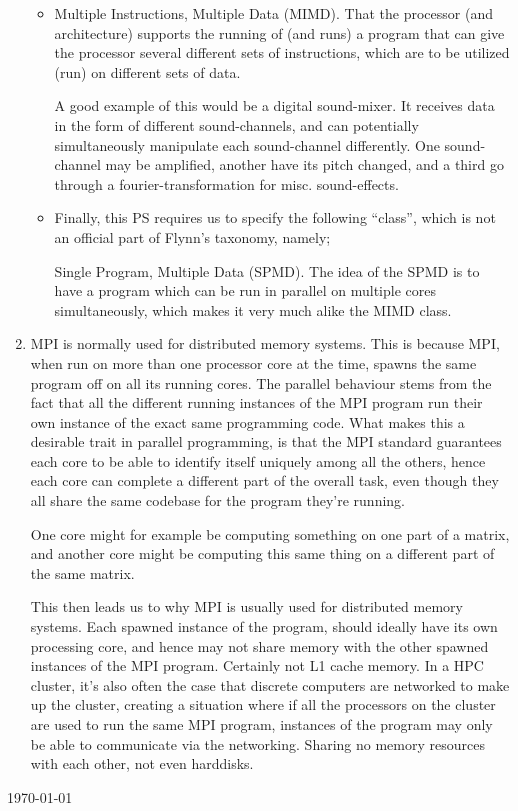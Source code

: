 \documentclass[fontsize=11pt, paper=a4, titlepage]{article}
\begin{document}
\begin{enumerate}
\begin{itemize}
        \item Multiple Instructions, Multiple Data (MIMD). That the processor
(and architecture) supports the running of (and runs) a program that can give
the processor several different sets of instructions, which are to be utilized
(run) on different sets of data.

A good example of this would be a digital sound-mixer. It receives data in the
form of different sound-channels, and can potentially simultaneously manipulate
each sound-channel differently. One sound-channel may be amplified, another have
its pitch changed, and a third go through a fourier-transformation for misc.
sound-effects.

        \item Finally, this PS requires us to specify the following ``class'',
which is not an official part of Flynn's taxonomy, namely;

Single Program, Multiple Data (SPMD). The idea of the SPMD is to have a program
which can be run in parallel on multiple cores simultaneously, which makes it
very much alike the MIMD class.

    \end{itemize}

    \item MPI is normally used for distributed memory systems. This is because
MPI, when run on more than one processor core at the time, spawns the same
program off on all its running cores. The parallel behaviour stems from the fact
that all the different running instances of the MPI program run their own
instance of the exact same programming code. What makes this a desirable trait
in parallel programming, is that the MPI standard guarantees each core to be
able to identify itself uniquely among all the others, hence each core can
complete a different part of the overall task, even though they all share the
same codebase for the program they're running.

One core might for example be computing something on one part of a matrix, and
another core might be computing this same thing on a different part of the same
matrix.

This then leads us to why MPI is usually used for distributed memory systems.
Each spawned instance of the program, should ideally have its own processing
core, and hence may not share memory with the other spawned instances of the MPI
program. Certainly not L1 cache memory. In a HPC cluster, it's also often the
case that discrete computers are networked to make up the cluster, creating a
situation where if all the processors on the cluster are used to run the same
MPI program, instances of the program may only be able to communicate via the
networking. Sharing no memory resources with each other, not even harddisks.

\end{enumerate}
\vfill
\large{\today}
\end{document}
